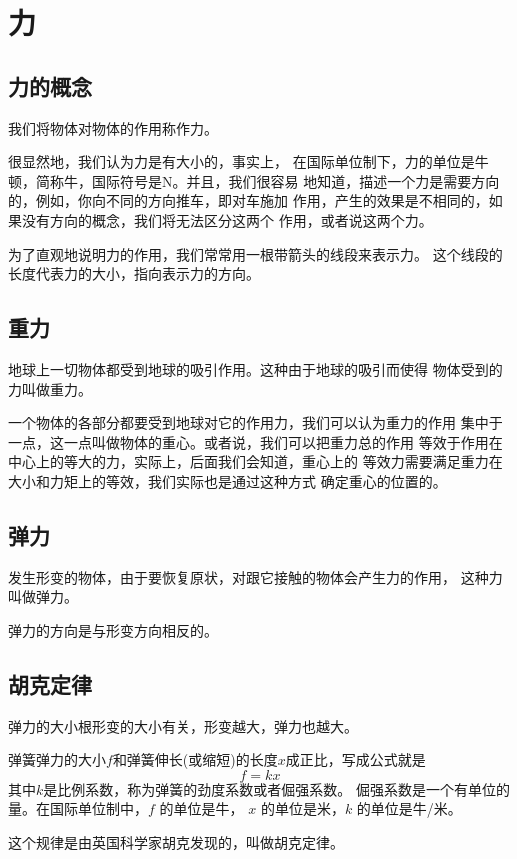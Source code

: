 \section{力}
\subsection{力的概念}
\begin{definition}
    我们将物体对物体的作用称作力。
\end{definition}

很显然地，我们认为力是有大小的，事实上，
在国际单位制下，力的单位是牛顿，简称牛，国际符号是N。并且，我们很容易
地知道，描述一个力是需要方向的，例如，你向不同的方向推车，即对车施加
作用，产生的效果是不相同的，如果没有方向的概念，我们将无法区分这两个
作用，或者说这两个力。

为了直观地说明力的作用，我们常常用一根带箭头的线段来表示力。
这个线段的长度代表力的大小，指向表示力的方向。
\subsection{重力}
\begin{definition}
    地球上一切物体都受到地球的吸引作用。这种由于地球的吸引而使得
    物体受到的力叫做重力。
\end{definition}

一个物体的各部分都要受到地球对它的作用力，我们可以认为重力的作用
集中于一点，这一点叫做物体的重心。或者说，我们可以把重力总的作用
等效于作用在中心上的等大的力，实际上，后面我们会知道，重心上的
等效力需要满足重力在大小和力矩上的等效，我们实际也是通过这种方式
确定重心的位置的。
\subsection{弹力}
\begin{definition}
    发生形变的物体，由于要恢复原状，对跟它接触的物体会产生力的作用，
    这种力叫做弹力。
\end{definition}

弹力的方向是与形变方向相反的。

\subsection{胡克定律}
弹力的大小根形变的大小有关，形变越大，弹力也越大。
\begin{theorem}
    弹簧弹力的大小$f$和弹簧伸长(或缩短)的长度$x$成正比，写成公式就是
    \begin{equation}
        f=kx
    \end{equation}
    其中$k$是比例系数，称为弹簧的劲度系数或者倔强系数。
    倔强系数是一个有单位的量。在国际单位制中，$f$ 的单位是牛，
    $x$ 的单位是米，$k$ 的单位是牛/米。
\end{theorem}
这个规律是由英国科学家胡克发现的，叫做胡克定律。

